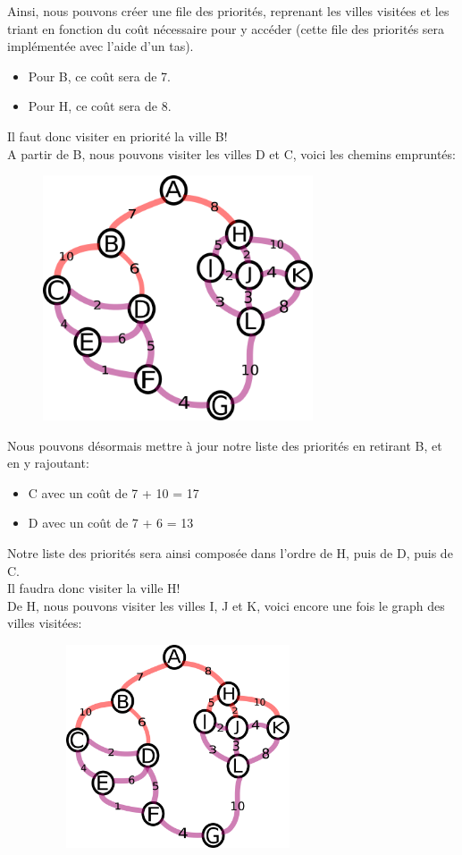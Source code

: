 \documentclass[a4paper, 12pt]{article}
\numberwithin{equation}{subsection}
\begin{document}
Ainsi, nous pouvons créer une file des priorités, reprenant les villes visitées et les triant en fonction du coût nécessaire pour y accéder (cette file des priorités sera implémentée avec l'aide d'un tas). \\
\begin{itemize}
  \item Pour B, ce coût sera de 7.
  \item Pour H, ce coût sera de 8.
\end{itemize}
Il faut donc visiter en priorité la ville B! \\
A partir de B, nous pouvons visiter les villes D et C, voici les chemins empruntés: \\
\begin{figure}[H]
  \centering
  \includegraphics[width=8.0cm]{imgs/third_search.png}
\end{figure}
Nous pouvons désormais mettre à jour notre liste des priorités en retirant B, et en y rajoutant: \\
\begin{itemize}
  \item C avec un coût de 7 + 10 = 17
  \item D avec un coût de 7 + 6 = 13
\end{itemize}
Notre liste des priorités sera ainsi composée dans l'ordre de H, puis de D, puis de C. \\
Il faudra donc visiter la ville H! \\
De H, nous pouvons visiter les villes I, J et K, voici encore une fois le graph des villes visitées: \\
\begin{figure}[H]
  \centering
  \includegraphics[width=8.0cm, height=6.0cm]{imgs/fourth_search.png}
\end{figure}
\end{document}
